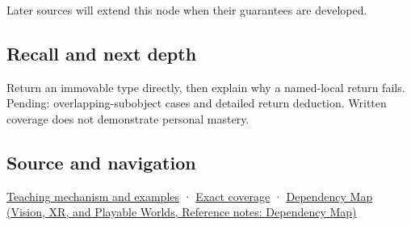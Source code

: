 \hypertarget{appendix-b08d3788c5c6-used-by}{}

Later sources will extend this node when their guarantees are developed.

\subsection{Recall and next depth}\label{appendix-b08d3788c5c6-recall-and-next-depth}

\hypertarget{appendix-b08d3788c5c6-recall-and-next-depth}{}

Return an immovable type directly, then explain why a named-local return fails. Pending: overlapping-subobject cases and detailed return deduction. Written coverage does not demonstrate personal mastery.

\subsection{Source and navigation}\label{appendix-b08d3788c5c6-source-and-navigation}

\hypertarget{appendix-b08d3788c5c6-source-and-navigation}{}

\hyperref[01-foundations-i-ch003-return-a-result-without-handing-out-a-lifetime-problem]{Teaching mechanism and examples} · \hyperref[appendix-fd090d982a15-m009---parts-127-147]{Exact coverage} · \href{../07-Vision-XR-and-Playable-Worlds/main.pdf\#nameddest=appendix-4ad47bdd269a}{Dependency Map (Vision, XR, and Playable Worlds, Reference notes: Dependency Map)}
